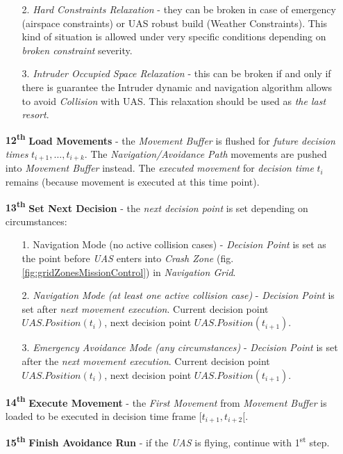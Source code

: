 \begin{itemize}
\begin{note}
\begin{itemize}
            \item[2.] \emph{Hard Constraints Relaxation} - they can be broken in case of emergency (airspace constraints) or UAS robust build (Weather Constraints). This kind of situation is allowed under very specific conditions depending on \emph{broken constraint} severity.
            
            \item[3.] \emph{Intruder Occupied Space Relaxation} - this can be broken if and only if there is guarantee the Intruder dynamic and navigation algorithm allows to avoid \emph{Collision} with UAS. This relaxation should be used as \emph{the last resort}.
        \end{itemize}
    \end{note}
    
    \item[\textbf{12\textsuperscript{th}}] \textbf{Load Movements} - the \emph{Movement Buffer} is flushed for \emph{future decision times} $t_{i+1}, \dots, t_{i+k}$. The \emph{Navigation/Avoidance Path} movements are pushed into \emph{Movement Buffer} instead. The \emph{executed movement} for \emph{decision time} $t_i$ remains (because movement is executed at this time point).
    
    \item[\textbf{13\textsuperscript{th}}] \textbf{Set Next Decision} - the \emph{next decision point} is set depending on circumstances:
    \begin{itemize}
        \item[1.] Navigation Mode (no active collision cases) - \emph{Decision Point} is set as the point before \emph{UAS} enters into \emph{Crash Zone} (fig. \ref{fig:gridZonesMissionControl}) in \emph{Navigation Grid}.
        
        \item[2.] \emph{Navigation Mode (at least one active collision case)} - \emph{Decision Point} is set after \emph{next movement execution}. Current decision point $UAS.Position(t_i)$, next decision point $UAS.Position(t_{i+1})$.
        
        \item[3.] \emph{Emergency Avoidance Mode (any circumstances)} - \emph{Decision Point} is set after the \emph{next movement execution}. Current decision point $UAS.Position(t_i)$, next decision point $UAS.Position(t_{i+1})$.
    \end{itemize}
    
    \item[\textbf{14\textsuperscript{th}}] \textbf{Execute Movement} - the \emph{First Movement} from \emph{Movement Buffer} is loaded to be executed in decision time frame $[t_{i+1}, t_{i+2}[$. 
    
    \item[\textbf{15\textsuperscript{th}}] \textbf{Finish Avoidance Run} - if the \emph{UAS} is flying, continue with 1\textsuperscript{st} step. 
\end{itemize}

